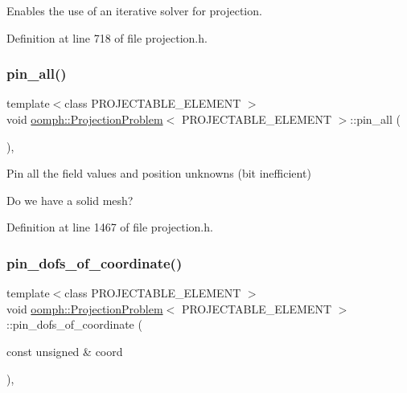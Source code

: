 Enables the use of an iterative solver for projection. 



Definition at line 718 of file projection.\+h.

\mbox{\label{classoomph_1_1ProjectionProblem_a9c24751d48a454956517a8541c423cf2}} 
\subsubsection{\texorpdfstring{pin\+\_\+all()}{pin\_all()}}
{\footnotesize\ttfamily template$<$class P\+R\+O\+J\+E\+C\+T\+A\+B\+L\+E\+\_\+\+E\+L\+E\+M\+E\+NT $>$ \\
void \hyperlink{classoomph_1_1ProjectionProblem}{oomph\+::\+Projection\+Problem}$<$ P\+R\+O\+J\+E\+C\+T\+A\+B\+L\+E\+\_\+\+E\+L\+E\+M\+E\+NT $>$\+::pin\+\_\+all (\begin{DoxyParamCaption}{ }\end{DoxyParamCaption})\hspace{0.3cm}{\ttfamily [inline]}, {\ttfamily [private]}}



Pin all the field values and position unknowns (bit inefficient) 

Do we have a solid mesh? 

Definition at line 1467 of file projection.\+h.

\mbox{\label{classoomph_1_1ProjectionProblem_ade05dce90814098ec0af15324b758730}} 
\subsubsection{\texorpdfstring{pin\+\_\+dofs\+\_\+of\+\_\+coordinate()}{pin\_dofs\_of\_coordinate()}}
{\footnotesize\ttfamily template$<$class P\+R\+O\+J\+E\+C\+T\+A\+B\+L\+E\+\_\+\+E\+L\+E\+M\+E\+NT $>$ \\
void \hyperlink{classoomph_1_1ProjectionProblem}{oomph\+::\+Projection\+Problem}$<$ P\+R\+O\+J\+E\+C\+T\+A\+B\+L\+E\+\_\+\+E\+L\+E\+M\+E\+NT $>$\+::pin\+\_\+dofs\+\_\+of\+\_\+coordinate (\begin{DoxyParamCaption}\item[{const unsigned \&}]{coord }\end{DoxyParamCaption})\hspace{0.3cm}{\ttfamily [inline]}, {\ttfamily [private]}}



